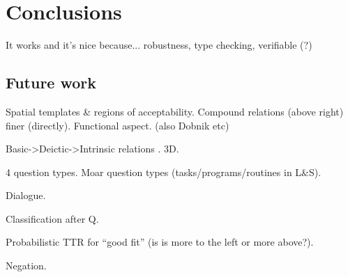 \documentclass[11pt, a4paper]{article}
\begin{document}
\section{Conclusions}
\label{sec:conclusions}

It works and it's nice because...
robustness, type checking, verifiable (?)



\subsection{Future work}

Spatial templates \& regions of acceptability. Compound relations (above right) finer (directly). Functional aspect.  \cite{LoganComputationalAnalysisApprehension1996} (also Dobnik etc)

Basic->Deictic->Intrinsic relations  \cite{LoganComputationalAnalysisApprehension1996}. 3D.

4 question types.
Moar question types (tasks/programs/routines in L\&S).

Dialogue.

Classification after Q.

Probabilistic TTR for ``good fit'' (is is more to the left or more above?).

Negation.




\end{document}
